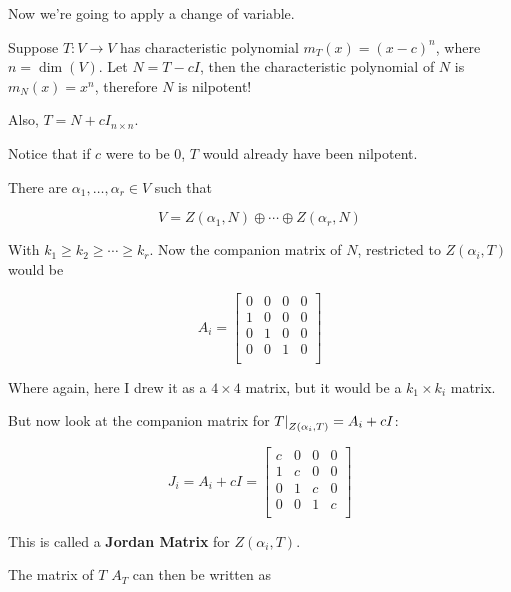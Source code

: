 \documentclass[12pt]{article}
\begin{document}
  Now we're going to apply a change of variable.

  Suppose $T: V \to V$ has characteristic polynomial $m_T(x) = (x - c)^n$, where
  $n = \dim(V)$. Let $N = T - cI$, then the characteristic polynomial of $N$ is
  $m_N(x) = x^n$, therefore $N$ is nilpotent!

  Also, $T = N + cI_{n \times n}$.

  Notice that if $c$ were to be 0, $T$ would already have been nilpotent.

  There are $\alpha_1, \dots, \alpha_r \in V$ such that

  \[
    V = Z(\alpha_1, N) \oplus \cdots \oplus Z(\alpha_r, N)
  \]

  With $k_1 \ge k_2 \ge \cdots \ge k_r$. Now the companion matrix of $N$,
  restricted to $Z(\alpha_i, T)$ would be

  \[
    A_i = \begin{bmatrix}
      0 & 0 & 0 & 0 \\
      1 & 0 & 0 & 0 \\
      0 & 1 & 0 & 0 \\
      0 & 0 & 1 & 0 \\
    \end{bmatrix}
  \]

  Where again, here I drew it as a $4 \times 4$ matrix, but it would be a $k_1
  \times k_i$ matrix.

  But now look at the companion matrix for $\restr{T}{Z(\alpha_i, T)} = A_i +
  cI$:

  \[
    J_i = A_i + cI =
    \begin{bmatrix}
      c & 0 & 0 & 0 \\
      1 & c & 0 & 0 \\
      0 & 1 & c & 0 \\
      0 & 0 & 1 & c \\
    \end{bmatrix}
  \]

  This is called a {\bf Jordan Matrix} for $Z(\alpha_i, T)$.

  The matrix of $T$ $A_T$ can then be written as
\end{document}
